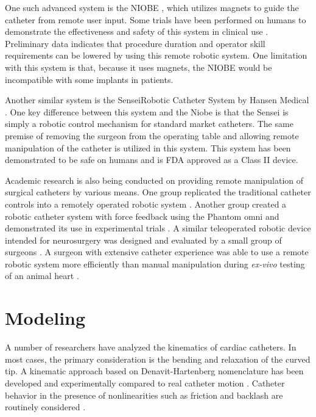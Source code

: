 \documentclass[letterpaper,10pt,conference]{ieeeconf}   %
\begin{document}
One such advanced system is the NIOBE \cite{NIOBE}, which utilizes magnets to guide the catheter from remote user input. Some trials have been performed on humans to demonstrate the effectiveness and safety of this system in clinical use \cite{pappone:06a}. Preliminary data indicates that procedure duration and operator skill requirements can be lowered by using this remote robotic system. One limitation with this system is that, because it uses magnets, the NIOBE would be incompatible with some implants in patients. 

Another similar system is the SenseiRobotic Catheter System by Hansen Medical \cite{HansenMedical:Sensei}. One key difference between this system and the Niobe is that the Sensei is simply a robotic control mechanism for standard market catheters. The same premise of removing the surgeon from the operating table and allowing remote manipulation of the catheter is utilized in this system. This system has been demonstrated to be safe on humans \cite{saliba:08a} and is FDA approved as a Class II device. 

Academic research is also being conducted on providing remote manipulation of surgical catheters by various means. One group replicated the traditional catheter controls into a remotely operated robotic system \cite{thakur:09a}. Another group created a robotic catheter system with force feedback using the Phantom omni and demonstrated its use in experimental trials \cite{xiao2012robotic}. A similar teleoperated robotic device intended for neurosurgery was designed and evaluated by a small group of surgeons \cite{srimathveeravalli:10a}. A surgeon with extensive catheter experience was able to use a remote robotic system more efficiently than manual manipulation during \textit{ex-vivo} testing of an animal heart \cite{cercenelli:07a}. 


\section{Modeling}
\label{sec:modeling}

A number of researchers have analyzed the kinematics of cardiac catheters. In most cases, the primary consideration is the bending and relaxation of the curved tip. A kinematic approach based on Denavit-Hartenberg nomenclature has been developed and experimentally compared to real catheter motion \cite{ganji:09a}. Catheter behavior in the presence of nonlinearities such as friction and backlash are routinely considered \cite{hasanzadeh:17a}.
\end{document}
